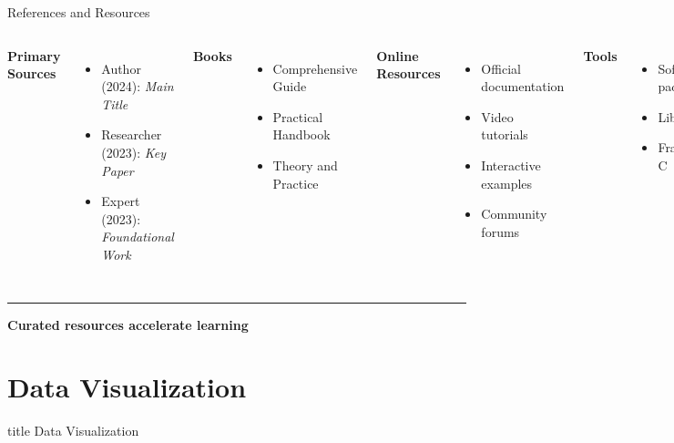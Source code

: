 \documentclass[8pt,aspectratio=169]{beamer}
\newcommand{\bottomnote}[1]{%
\vfill
\vspace{-2mm}
\textcolor{mllavender2}{\rule{\textwidth}{0.4pt}}
\vspace{1mm}
\footnotesize
\textbf{#1}
}
\begin{document}
\begin{frame}[t]{References and Resources}
\begin{columns}[T]
\textbf{Primary Sources}
\begin{itemize}
\item Author (2024): \textit{Main Title}
\item Researcher (2023): \textit{Key Paper}
\item Expert (2023): \textit{Foundational Work}
\end{itemize}

\vspace{0.5em}
\textbf{Books}
\begin{itemize}
\item Comprehensive Guide
\item Practical Handbook
\item Theory and Practice
\end{itemize}

\textbf{Online Resources}
\begin{itemize}
\item Official documentation
\item Video tutorials
\item Interactive examples
\item Community forums
\end{itemize}

\vspace{0.5em}
\textbf{Tools}
\begin{itemize}
\item Software package A
\item Library B
\item Framework C
\end{itemize}
\end{columns}

\bottomnote{Curated resources accelerate learning}
\end{frame}

\section{Data Visualization}

\begin{frame}[t]
\vfill
\centering
\begin{beamercolorbox}[sep=8pt,center]{title}
\Large Data Visualization\par
\end{beamercolorbox}
\vfill
\end{frame}
\end{document}

